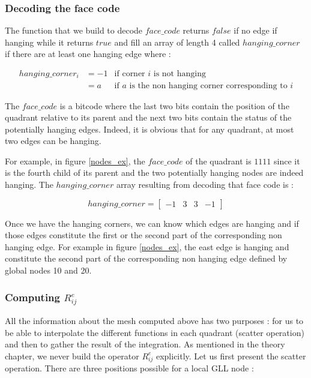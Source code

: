 \subsubsection{Decoding the face code}

The function that we build to decode $face\_code$ returns $false$ if no edge if hanging while it returns $true$ and fill an array of length 4 called $hanging\_corner$ if there are at least one hanging edge where : 

\begin{align*}
hanging\_corner_i &= -1 &\text{if corner $i$ is not hanging}\\
&= a &\text{if $a$ is the non hanging corner corresponding to $i$}
\end{align*}

The $face\_code$ is a bitcode where the last two bits contain the position of the quadrant relative to its parent and the next two bits contain the status of the potentially hanging edges. Indeed, it is obvious that for any quadrant, at most two edges can be hanging. 

For example, in figure \ref{nodes_ex}, the $face\_code$ of the quadrant is $1111$ since it is the fourth child of its parent and the two potentially hanging nodes are indeed hanging. The $hanging\_corner$ array resulting from decoding that face code is : 

$$hanging\_corner = \begin{bmatrix}
-1 &3& 3& -1
\end{bmatrix}$$

Once we have the hanging corners, we can know which edges are hanging and if those edges constitute the first or the second part of the corresponding non hanging edge. For example in figure \ref{nodes_ex}, the east edge is hanging and constitute the second part of the corresponding non hanging edge defined by global nodes 10 and 20. 

\subsubsection{Computing $R_{ij}^e$}

All the information about the mesh computed above has two purposes : for us to be able to interpolate the different functions in each quadrant (scatter operation) and then to gather the result of the integration. As mentioned in the theory chapter, we never build the operator $R_{ij}^e$ explicitly. Let us first present the scatter operation. There are three positions possible for a local GLL node : 

